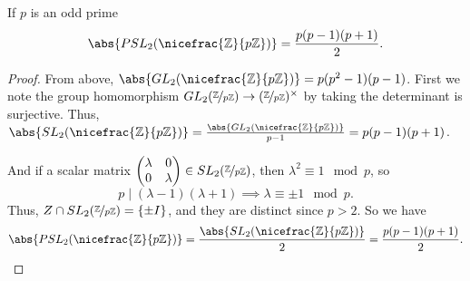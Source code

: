 \leavevmode
\begin{lemma}{}{}
    If \(p\) is an odd prime
    \[
        \abs{PSL_2(\nicefrac{\mathbb{\MakeUppercase{Z}}}{p\mathbb{\MakeUppercase{Z}}})} = \frac{p(p-1)(p+1)}{2}.
    \]
\end{lemma}
\begin{proof}
    From above, \(\abs{GL_2(\nicefrac{\mathbb{\MakeUppercase{Z}} }{p\mathbb{\MakeUppercase{Z}} })} = p(p^2 - 1)(p-1)\). First we note the group homomorphism \(GL_2(\nicefrac{\mathbb{\MakeUppercase{Z}} }{p\mathbb{\MakeUppercase{Z}}})\to (\nicefrac{\mathbb{\MakeUppercase{Z}}}{p\mathbb{\MakeUppercase{Z}}})^{\times}\) by taking the determinant is surjective. Thus, \(\abs{SL_2(\nicefrac{\mathbb{\MakeUppercase{Z}} }{p\mathbb{\MakeUppercase{Z}} })} = \frac{\abs{GL_2(\nicefrac{\mathbb{\MakeUppercase{Z}}}{p\mathbb{\MakeUppercase{Z}} })}}{p - 1} = p(p - 1)(p + 1)\).
    
    And if a scalar matrix \(\begin{pmatrix}
        \lambda &  0 \\
        0 &  \lambda \\
    \end{pmatrix} \in SL_2(\nicefrac{\mathbb{\MakeUppercase{Z}} }{p \mathbb{\MakeUppercase{Z}} })\), then \(\lambda^2 \equiv 1 \mod p\), so
    \[p \mid (\lambda-1)(\lambda + 1)\implies \lambda\equiv \pm 1 \mod p.\]
    Thus, \(Z \cap SL_2(\nicefrac{\mathbb{\MakeUppercase{Z}} }{p\mathbb{\MakeUppercase{Z}} }) = \{\pm I\}\), and they are distinct since \(p > 2\). So we have
    \[\abs{PSL_2(\nicefrac{\mathbb{\MakeUppercase{Z}} }{p\mathbb{\MakeUppercase{Z}} })} = \frac{\abs{SL_2(\nicefrac{\mathbb{\MakeUppercase{Z}}}{p\mathbb{\MakeUppercase{Z}} })}}{2} = \frac{p(p - 1)(p + 1)}{2}.\]
\end{proof}
